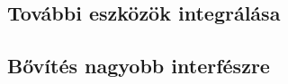 \chapter{\FurtherDevelopment}

\section{További eszközök integrálása}

\section{Bővítés nagyobb interfészre}
